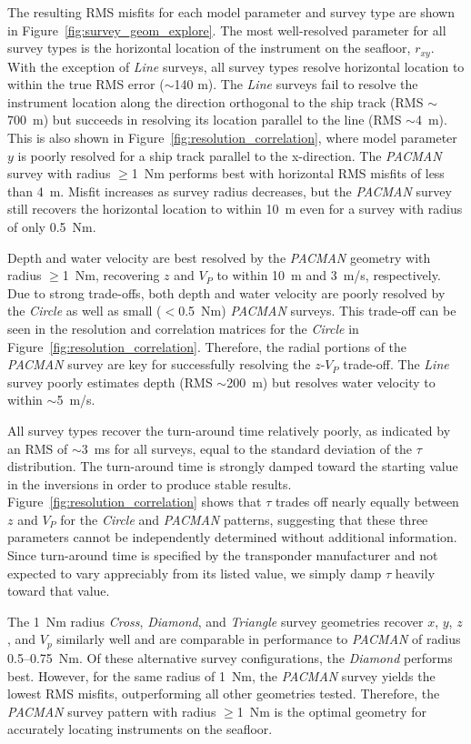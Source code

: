 The resulting RMS misfits for each model parameter and survey type are shown in Figure~\ref{fig:survey_geom_explore}. The most well-resolved parameter for all survey types is the horizontal location of the instrument on the seafloor, $r_{xy}$. With the exception of \textit{Line} surveys, all survey types resolve horizontal location to within the true RMS error ($\sim$140 m). The \textit{Line} surveys fail to resolve the instrument location along the direction orthogonal to the ship track (RMS $\sim$700~m) but succeeds in resolving its location parallel to the line (RMS $\sim$4~m). This is also shown in Figure~\ref{fig:resolution_correlation}, where model parameter $y$ is poorly resolved for a ship track parallel to the x-direction. The \textit{PACMAN} survey with radius $\geq$1~Nm performs best with horizontal RMS misfits of less than 4~m. Misfit increases as survey radius decreases, but the \textit{PACMAN} survey still recovers the horizontal location to within 10~m even for a survey with radius of only 0.5~Nm.

Depth and water velocity are best resolved by the \textit{PACMAN} geometry with radius $\geq$1~Nm, recovering $z$ and $V_{P}$ to within 10~m and 3~m/s, respectively. Due to strong trade-offs, both depth and water velocity are poorly resolved by the \textit{Circle} as well as small ($<$0.5~Nm) \textit{PACMAN} surveys. This trade-off can be seen in the resolution and correlation matrices for the \textit{Circle} in Figure~\ref{fig:resolution_correlation}. Therefore, the radial portions of the \textit{PACMAN} survey are key for successfully resolving the $z$-$V_P$ trade-off. The \textit{Line} survey poorly estimates depth (RMS $\sim$200~m) but resolves water velocity to within $\sim$5~m/s.

All survey types recover the turn-around time relatively poorly, as indicated by an RMS of $\sim$3~ms for all surveys, equal to the standard deviation of the $\tau$ distribution. The turn-around time is strongly damped toward the starting value in the inversions in order to produce stable results. Figure~\ref{fig:resolution_correlation} shows that $\tau$ trades off nearly equally between $z$ and $V_{P}$ for the \textit{Circle} and \textit{PACMAN} patterns, suggesting that these three parameters cannot be independently determined without additional information. Since turn-around time is specified by the transponder manufacturer and not expected to vary appreciably from its listed value, we simply damp $\tau$ heavily toward that value.

The 1~Nm radius \textit{Cross}, \textit{Diamond}, and \textit{Triangle} survey geometries recover $x$, $y$, $z$, and $V_{p}$ similarly well and are comparable in performance to \textit{PACMAN} of radius 0.5--0.75~Nm. Of these alternative survey configurations, the \textit{Diamond} performs best. However, for the same radius of 1~Nm, the \textit{PACMAN} survey yields the lowest RMS misfits, outperforming all other geometries tested. Therefore, the \textit{PACMAN} survey pattern with radius $\geq$1~Nm is the optimal geometry for accurately locating instruments on the seafloor.

